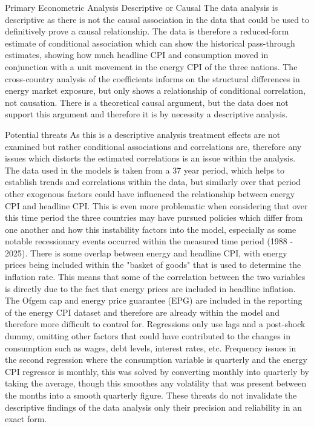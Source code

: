
Primary Econometric Analysis
Descriptive or Causal
The data analysis is descriptive as there is not the causal association in the data that could be used to definitively prove a causal relationship. The data is therefore a reduced-form estimate of conditional association which can show the historical pass-through estimates, showing how much headline CPI and consumption moved in conjunction with a unit movement in the energy CPI of the three nations. The cross-country analysis of the coefficients informs on the structural differences in energy market exposure, but only shows a relationship of conditional correlation, not causation. There is a theoretical causal argument, but the data does not support this argument and therefore it is by necessity a descriptive analysis.

Potential threats
As this is a descriptive analysis treatment effects are not examined but rather conditional associations and correlations are, therefore any issues which distorts the estimated correlations is an issue within the analysis. The data used in the models is taken from a 37 year period, which helps to establish trends and correlations within the data, but similarly over that period other exogenous factors could have influenced the relationship between energy CPI and headline CPI. This is even more problematic when considering that over this time period the three countries may have pursued policies which differ from one another and how this instability factors into the model, especially as some notable recessionary events occurred within the measured time period (1988 - 2025).
There is some overlap between energy and headline CPI, with energy prices being included within the "basket of goods" that is used to determine the inflation rate. This means that some of the correlation between the two variables is directly due to the fact that energy prices are included in headline inflation.
The Ofgem cap and energy price guarantee (EPG) are included in the reporting of the energy CPI dataset and therefore are already within the model and therefore more difficult to control for. 
Regressions only use lags and a post-shock dummy, omitting other factors that could have contributed to the changes in consumption such as wages, debt levels, interest rates, etc.
Frequency issues in the second regression where the consumption variable is quarterly and the energy CPI regressor is monthly, this was solved by converting monthly into quarterly by taking the average, though this smoothes any volatility that was present between the months into a smooth quarterly figure.
These threats do not invalidate the descriptive findings of the data analysis only their precision and reliability in an exact form.


